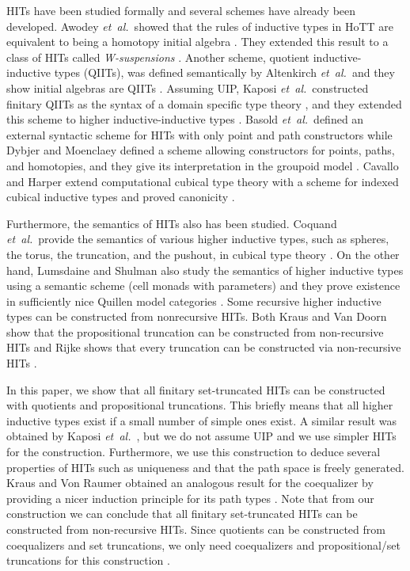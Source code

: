 \documentclass[9pt]{entcs}
\newcommand{\etal}{\emph{et~al.}}
\newcommand{\0}{\textbf{0}} %
\newcommand{\1}{\textbf{1}} %
\begin{document}
HITs have been studied formally and several schemes have already been developed.
Awodey \etal \ showed that the rules of inductive types \cite{dybjer1994inductive} in HoTT are equivalent to being a homotopy initial algebra \cite{AwodeyGS12}.
They extended this result to a class of HITs called \emph{W-suspensions} \cite{Sojakova15}.
Another scheme, quotient inductive-inductive types (QIITs), was defined semantically by Altenkirch \etal \ and they show initial algebras are QIITs \cite{AltenkirchCDKF18}.
Assuming UIP, Kaposi \etal \ constructed finitary QIITs as the syntax of a domain specific type theory \cite{KaposiKA19}, and they extended this scheme to higher inductive-inductive types \cite{KaposiK18}.
Basold \etal \ defined an external syntactic scheme for HITs with only point and path constructors \cite{BasoldGW17}
while Dybjer and Moenclaey defined a scheme allowing constructors for points, paths, and homotopies, and they give its interpretation in the groupoid model  \cite{DybjerM18,HofmannS94}.
Cavallo and Harper extend computational cubical type theory with a scheme for indexed cubical inductive types and proved canonicity \cite{AngiuliHW17,CavalloH19}.

Furthermore, the semantics of HITs also has been studied.
Coquand \etal \ provide the semantics of various higher inductive types, such as spheres, the torus, the truncation, and the pushout, in cubical type theory \cite{BezemCH13,CohenCHM16,CoquandHM18}.
On the other hand, Lumsdaine and Shulman also study the semantics of higher inductive types using a semantic scheme (cell monads with parameters) and they prove existence in sufficiently nice Quillen model categories \cite{lumsdaine2017semantics}.
Some recursive higher inductive types can be constructed from nonrecursive HITs.
Both Kraus and Van Doorn show that the propositional truncation can be constructed from non-recursive HITs \cite{Kraus16,Doorn16} and Rijke shows that every truncation can be constructed via non-recursive HITs \cite{rijke2017join}.

In this paper, we show that all finitary set-truncated HITs can be constructed with quotients and propositional truncations. 
This briefly means that all higher inductive types exist if a small number of simple ones exist.
A similar result was obtained by Kaposi \etal \ \cite{KaposiKA19}, but we do not assume UIP and we use simpler HITs for the construction.
Furthermore, we use this construction to deduce several properties of HITs such as uniqueness and that the path space is freely generated.
Kraus and Von Raumer obtained an analogous result for the coequalizer by providing a nicer induction principle for its path types \cite{KrausRaumer}.
Note that from our construction we can conclude that all finitary set-truncated HITs can be constructed from non-recursive HITs.
Since quotients can be constructed from coequalizers and set truncations, we only need coequalizers and propositional/set truncations for this construction \cite{rijke2017join}.
\end{document}
